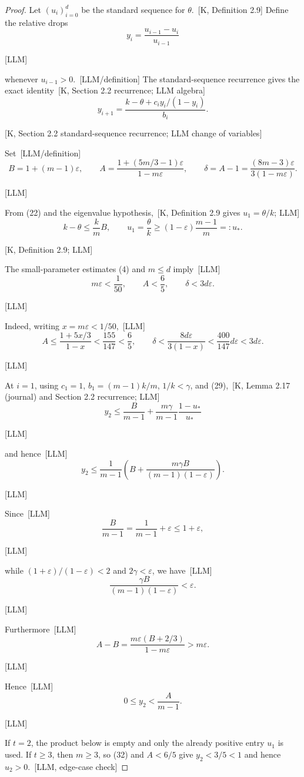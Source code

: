 \documentclass[10pt]{amsart}
\theoremstyle{remark}
\newcommand{\eps}{\varepsilon}
\newcommand{\prov}[1]{\unskip\, {\normalfont\scriptsize\color{provgray}\textsf{[#1]}}}
\newcommand{\eqprov}[1]{%
  \par\nobreak\vspace{-0.68\baselineskip}%
  \noindent\hfill{\normalfont\scriptsize\color{provgray}\textsf{[#1]}}%
  \par\vspace{0.20\baselineskip}%
}
\begin{document}
\begin{proof}
Let $(u_i)_{i=0}^{d}$ be the standard sequence for $\theta$.\prov{K, Definition 2.9} Define the relative drops
\begin{equation}
y_i=\frac{u_{i-1}-u_i}{u_{i-1}}
\end{equation}
\eqprov{LLM}
whenever $u_{i-1}>0$.\prov{LLM/definition} The standard-sequence recurrence gives the exact identity\prov{K, Section 2.2 recurrence; LLM algebra}
\begin{equation}
y_{i+1}=\frac{k-\theta+c_i y_i/(1-y_i)}{b_i}.
\end{equation}
\eqprov{K, Section 2.2 standard-sequence recurrence; LLM change of variables}
Set\prov{LLM/definition}
\begin{equation}
B=1+(m-1)\eps,
\qquad
A=\frac{1+(5m/3-1)\eps}{1-m\eps},
\qquad
\delta=A-1=\frac{(8m-3)\eps}{3(1-m\eps)}.
\end{equation}
\eqprov{LLM}
From (22) and the eigenvalue hypothesis,\prov{K, Definition 2.9 gives $u_1=\theta/k$; LLM}
\begin{equation}
k-\theta\le\frac{k}{m}B,
\qquad
u_1=\frac{\theta}{k}\ge(1-\eps)\frac{m-1}{m}=:u_*.
\end{equation}
\eqprov{K, Definition 2.9; LLM}
The small-parameter estimates (4) and $m\le d$ imply\prov{LLM}
\begin{equation}
m\eps<\frac1{50},\qquad A<\frac65,
\qquad \delta<3d\eps.
\end{equation}
\eqprov{LLM}
Indeed, writing $x=m\eps<1/50$,\prov{LLM}
\[
A\le\frac{1+5x/3}{1-x}<\frac{155}{147}<\frac65,
\qquad
\delta<\frac{8d\eps}{3(1-x)}<\frac{400}{147}d\eps<3d\eps.
\]
\eqprov{LLM}

At $i=1$, using $c_1=1$, $b_1=(m-1)k/m$, $1/k<\gamma$, and (29),\prov{K, Lemma 2.17 (journal) and Section 2.2 recurrence; LLM}
\[
y_2\le\frac{B}{m-1}+\frac{m\gamma}{m-1}\frac{1-u_*}{u_*}
\]
\eqprov{LLM}
and hence\prov{LLM}
\begin{equation}
y_2\le\frac1{m-1}\left(B+\frac{m\gamma B}{(m-1)(1-\eps)}\right).
\end{equation}
\eqprov{LLM}
Since\prov{LLM}
\[
\frac{B}{m-1}=\frac1{m-1}+\eps\le1+\eps,
\]
\eqprov{LLM}
while $(1+\eps)/(1-\eps)<2$ and $2\gamma<\eps$, we have\prov{LLM}
\[
\frac{\gamma B}{(m-1)(1-\eps)}<\eps.
\]
\eqprov{LLM}
Furthermore\prov{LLM}
\[
A-B=\frac{m\eps(B+2/3)}{1-m\eps}>m\eps.
\]
\eqprov{LLM}
Hence\prov{LLM}
\begin{equation}
0\le y_2<\frac{A}{m-1}.
\end{equation}
\eqprov{LLM}
If $t=2$, the product below is empty and only the already positive entry $u_1$ is used. If $t\ge3$, then $m\ge3$, so (32) and $A<6/5$ give $y_2<3/5<1$ and hence $u_2>0$.\prov{LLM, edge-case check}


\end{proof}
\end{document}
